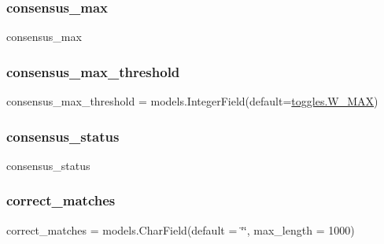 \subsubsection{\texorpdfstring{consensus\_max}{consensus\_max}}
{\footnotesize\ttfamily consensus\+\_\+max}

\mbox{\label{classdynamicfilterapp_1_1models_1_1_predicate_a8bd4e3573ed7514dc98a1615fe047c23}} 
\subsubsection{\texorpdfstring{consensus\_max\_threshold}{consensus\_max\_threshold}}
{\footnotesize\ttfamily consensus\+\_\+max\+\_\+threshold = models.\+Integer\+Field(default=\mbox{\hyperlink{namespacedynamicfilterapp_1_1toggles_add63171ca968cbd5ca4d60dfbf9a2746}{toggles.\+W\+\_\+\+M\+AX}})\hspace{0.3cm}{\ttfamily [static]}}

\mbox{\label{classdynamicfilterapp_1_1models_1_1_predicate_aed00cc02057c0555b36ade73a3403506}} 
\subsubsection{\texorpdfstring{consensus\_status}{consensus\_status}}
{\footnotesize\ttfamily consensus\+\_\+status}

\mbox{\label{classdynamicfilterapp_1_1models_1_1_predicate_afa7f671131faeb023ff23ff8593cc029}} 
\subsubsection{\texorpdfstring{correct\_matches}{correct\_matches}}
{\footnotesize\ttfamily correct\+\_\+matches = models.\+Char\+Field(default = \char`\"{}\char`\"{}, max\+\_\+length = 1000)\hspace{0.3cm}{\ttfamily [static]}}

